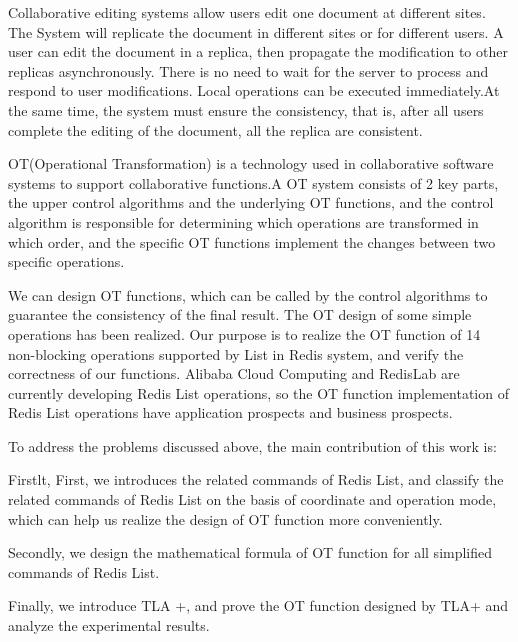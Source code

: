 \begin{englishabstract}
\par Collaborative editing systems allow users edit one document at different sites. The System will replicate the document in different sites or for different users. A user can edit the document in a replica, then propagate the modification to other replicas asynchronously. There is no need to wait for the server to process and respond to user modifications. Local operations can be executed immediately.At the same time, the system must ensure the consistency, that is, after all users complete the editing of the document, all the replica are consistent.
\par OT(Operational Transformation) is a technology used in collaborative software systems to support collaborative functions.A OT system consists of 2 key parts, the upper control algorithms and the underlying OT functions, and the control algorithm is responsible for determining which operations are transformed in which order, and the specific OT functions implement the changes between two specific operations.
\par We can design OT functions, which can be called by the control algorithms to guarantee the consistency of the final result. The OT design of some simple operations has been realized. Our purpose is to realize the OT function of 14 non-blocking operations supported by List in Redis system, and verify the correctness of our functions. Alibaba Cloud Computing and RedisLab are currently developing Redis List operations, so the OT function implementation of Redis List operations have application prospects and business prospects.
\par To address the problems discussed above, the main contribution of this work is:
\par Firstlt, First, we introduces the related commands of Redis List, and classify the related commands of Redis List on the basis of coordinate and operation mode, which can help us realize the design of OT function more conveniently.
\par Secondly, we design the mathematical formula of OT function for all simplified commands of Redis List.
\par Finally, we introduce TLA +, and prove the OT function designed by TLA+ and analyze the experimental results.
\end{englishabstract}